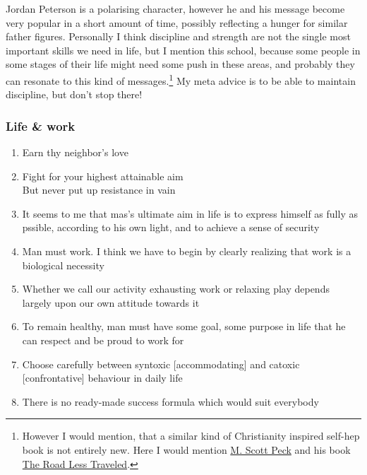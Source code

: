 \documentclass{article}
\begin{document}
\vspace{12pt}

Jordan Peterson is a polarising character, however he and his message become very popular in a short amount of time, possibly reflecting a hunger for similar father figures. Personally I think discipline and strength are not the single most important skills we need in life, but I mention this school, because some people in some stages of their life might need some push in these areas, and probably they can resonate to this kind of messages.\footnote{However I would mention, that a similar kind of Christianity inspired self-hep book is not entirely new. Here I would mention \href{https://en.wikipedia.org/wiki/M._Scott_Peck}{M. Scott Peck} and his book \href{https://www.goodreads.com/book/show/347852.The_Road_Less_Traveled}{The Road Less Traveled}.} 
My meta advice is to be able to maintain discipline, but don't stop there!

\subsubsection{Life \& work}

\begin{enumerate}
    \item Earn thy neighbor’s love
    \item Fight for your highest attainable aim \\
    But never put up resistance in vain
    \item It seems to me that mas's ultimate aim in life is to express himself as fully as pssible, according to his own light, and to achieve a sense of security
    \item Man must work. I think we have to begin by clearly realizing that work is a biological necessity
    \item Whether we call our activity exhausting work or relaxing play depends largely upon our own attitude towards it
    \item To remain healthy, man must have some goal, some purpose in life that he can respect and be proud to work for
    \item Choose carefully between syntoxic [accommodating] and catoxic [confrontative] behaviour in daily life
    \item There is no ready-made success formula which would suit everybody
\end{enumerate}
\end{document}
